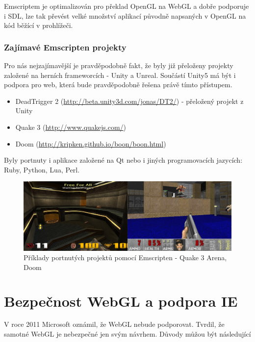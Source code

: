 \documentclass[12pt,a4paper,titlepage,final]{report}
\begin{document}
Emscriptem je optimalizován pro překlad OpenGL na WebGL a dobře podporuje i SDL, lze tak převést velké množství aplikací původně napsaných v OpenGL na kód běžící v prohlížeči.

\subsubsection{Zajímavé Emscripten projekty}

Pro nás nejzajímavější je pravděpodobně fakt, že byly již přeloženy projekty založené na herních frameworcích - Unity a Unreal. Součástí Unity5 má být i podpora pro web, která bude pravděpodobně řešena právě tímto přístupem.

\begin{itemize}
	\item DeadTrigger 2 (\url{http://beta.unity3d.com/jonas/DT2/}) - přeložený projekt z Unity
	\item Quake 3 (\url{http://www.quakejs.com/})
	\item Doom (\url{http://kripken.github.io/boon/boon.html})
\end{itemize}

Byly portnuty i aplikace založené na Qt nebo i jiných programovacích jazycích: Ruby, Python, Lua, Perl.

\begin{figure}[ht]
\begin{center}
\includegraphics[width=14cm]{images/quakedoom.jpg}
\caption{Příklady portnutých projektů pomocí Emscripten - Quake 3 Arena, Doom}
\label{fig:theory}
\end{center}
\end{figure}

\section{Bezpečnost WebGL a podpora IE}

V roce 2011 Microsoft oznámil, že WebGL nebude podporovat. Tvrdil, že samotné WebGL je nebezpečné jen svým návrhem. Důvody můžou být následující
\end{document}

